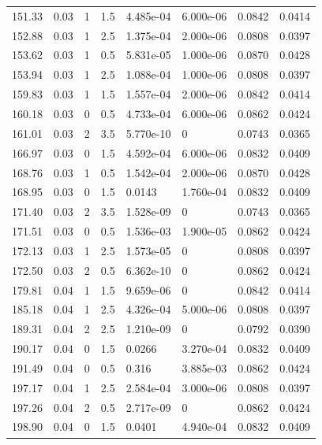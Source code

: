 \documentclass[preview]{standalone}
\begin{document}
{{{\begin{tabular}{L{1.2cm}C{1.2cm} C{0.3cm}C{0.5cm} C{1.4cm}C{1.4cm} C{1.4cm}C{1.4cm}}
  151.33  &  0.03  & 1     & 1.5 &  4.485e-04  & 6.000e-06  & 0.0842 &  0.0414   \\ 
  152.88  &  0.03  & 1     & 2.5 &  1.375e-04  & 2.000e-06  & 0.0808 &  0.0397   \\ 
  153.62  &  0.03  & 1     & 0.5 &  5.831e-05  & 1.000e-06  & 0.0870 &  0.0428   \\ 
  153.94  &  0.03  & 1     & 2.5 &  1.088e-04  & 1.000e-06  & 0.0808 &  0.0397   \\ 
  159.83  &  0.03  & 1     & 1.5 &  1.557e-04  & 2.000e-06  & 0.0842 &  0.0414   \\ 
  160.18  &  0.03  & 0     & 0.5 &  4.733e-04  & 6.000e-06  & 0.0862 &  0.0424   \\ 
  161.01  &  0.03  & 2     & 3.5 &  5.770e-10  & 0  & 0.0743 &  0.0365   \\ 
  166.97  &  0.03  & 0     & 1.5 &  4.592e-04  & 6.000e-06  & 0.0832 &  0.0409   \\ 
  168.76  &  0.03  & 1     & 0.5 &  1.542e-04  & 2.000e-06  & 0.0870 &  0.0428   \\ 
  168.95  &  0.03  & 0     & 1.5 &  0.0143  & 1.760e-04  & 0.0832 &  0.0409   \\ 
  171.40  &  0.03  & 2     & 3.5 &  1.528e-09  & 0  & 0.0743 &  0.0365   \\ 
  171.51  &  0.03  & 0     & 0.5 &  1.536e-03  & 1.900e-05  & 0.0862 &  0.0424   \\ 
  172.13  &  0.03  & 1     & 2.5 &  1.573e-05  & 0  & 0.0808 &  0.0397   \\ 
  172.50  &  0.03  & 2     & 0.5 &  6.362e-10  & 0  & 0.0862 &  0.0424   \\ 
  179.81  &  0.04  & 1     & 1.5 &  9.659e-06  & 0  & 0.0842 &  0.0414   \\ 
  185.18  &  0.04  & 1     & 2.5 &  4.326e-04  & 5.000e-06  & 0.0808 &  0.0397   \\ 
  189.31  &  0.04  & 2     & 2.5 &  1.210e-09  & 0  & 0.0792 &  0.0390   \\ 
  190.17  &  0.04  & 0     & 1.5 &  0.0266  & 3.270e-04  & 0.0832 &  0.0409   \\ 
  191.49  &  0.04  & 0     & 0.5 &  0.316  & 3.885e-03  & 0.0862 &  0.0424   \\ 
  197.17  &  0.04  & 1     & 2.5 &  2.584e-04  & 3.000e-06  & 0.0808 &  0.0397   \\ 
  197.26  &  0.04  & 2     & 0.5 &  2.717e-09  & 0  & 0.0862 &  0.0424   \\ 
  198.90  &  0.04  & 0     & 1.5 &  0.0401  & 4.940e-04  & 0.0832 &  0.0409   \\ 

\end{tabular}}}}
\end{document}
